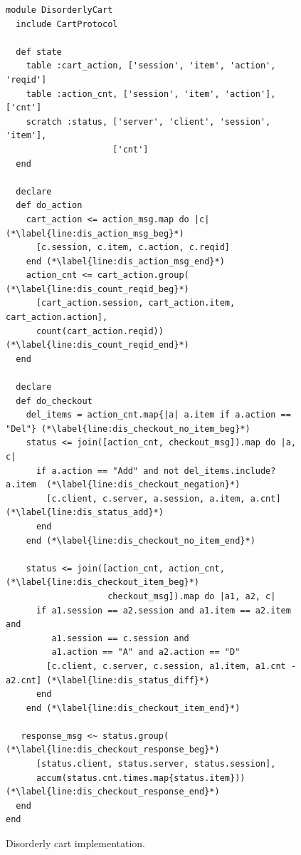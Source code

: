 \begin{figure}[t]
\begin{scriptsize}
\begin{lstlisting}
module DisorderlyCart
  include CartProtocol

  def state
    table :cart_action, ['session', 'item', 'action', 'reqid']
    table :action_cnt, ['session', 'item', 'action'], ['cnt']
    scratch :status, ['server', 'client', 'session', 'item'],
                     ['cnt']
  end

  declare
  def do_action
    cart_action <= action_msg.map do |c| (*\label{line:dis_action_msg_beg}*)
      [c.session, c.item, c.action, c.reqid] 
    end (*\label{line:dis_action_msg_end}*)
    action_cnt <= cart_action.group(  (*\label{line:dis_count_reqid_beg}*)
      [cart_action.session, cart_action.item, cart_action.action],
      count(cart_action.reqid))  (*\label{line:dis_count_reqid_end}*)
  end

  declare
  def do_checkout
    del_items = action_cnt.map{|a| a.item if a.action == "Del"} (*\label{line:dis_checkout_no_item_beg}*)
    status <= join([action_cnt, checkout_msg]).map do |a, c|
      if a.action == "Add" and not del_items.include? a.item  (*\label{line:dis_checkout_negation}*)
        [c.client, c.server, a.session, a.item, a.cnt] (*\label{line:dis_status_add}*)
      end
    end (*\label{line:dis_checkout_no_item_end}*)

    status <= join([action_cnt, action_cnt, (*\label{line:dis_checkout_item_beg}*)
                    checkout_msg]).map do |a1, a2, c|
      if a1.session == a2.session and a1.item == a2.item and
         a1.session == c.session and
         a1.action == "A" and a2.action == "D"
        [c.client, c.server, c.session, a1.item, a1.cnt - a2.cnt] (*\label{line:dis_status_diff}*)
      end
    end (*\label{line:dis_checkout_item_end}*)

   response_msg <~ status.group( (*\label{line:dis_checkout_response_beg}*)
      [status.client, status.server, status.session],
      accum(status.cnt.times.map{status.item})) (*\label{line:dis_checkout_response_end}*)
  end
end
\end{lstlisting}
\vspace{-10pt}
\caption{Disorderly cart implementation.}
\label{fig:dis-cart}
\end{scriptsize}
\vspace{-2pt}
\end{figure}

